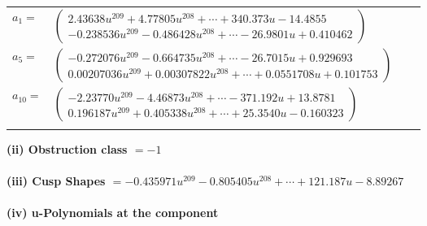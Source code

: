\documentclass[1p]{elsarticle_modified}
\theoremstyle{definition}
\begin{document}
\begin{tabular}{m{7pt} m{180pt} m{7pt} m{180pt} }
\flushright $a_{1}=$&$\begin{pmatrix}2.43638 u^{209}+4.77805 u^{208}+\cdots+340.373 u-14.4855\\-0.238536 u^{209}-0.486428 u^{208}+\cdots-26.9801 u+0.410462\end{pmatrix}$ \\
\flushright $a_{5}=$&$\begin{pmatrix}-0.272076 u^{209}-0.664735 u^{208}+\cdots-26.7015 u+0.929693\\0.00207036 u^{209}+0.00307822 u^{208}+\cdots+0.0551708 u+0.101753\end{pmatrix}$ \\
\flushright $a_{10}=$&$\begin{pmatrix}-2.23770 u^{209}-4.46873 u^{208}+\cdots-371.192 u+13.8781\\0.196187 u^{209}+0.405338 u^{208}+\cdots+25.3540 u-0.160323\end{pmatrix}$\\&\end{tabular}
\flushleft \textbf{(ii) Obstruction class $= -1$}\\~\\
\flushleft \textbf{(iii) Cusp Shapes $= -0.435971 u^{209}-0.805405 u^{208}+\cdots+121.187 u-8.89267$}\\~\\
\newpage\renewcommand{\arraystretch}{1}
\flushleft \textbf{(iv) u-Polynomials at the component}\newline \\
\end{document}
